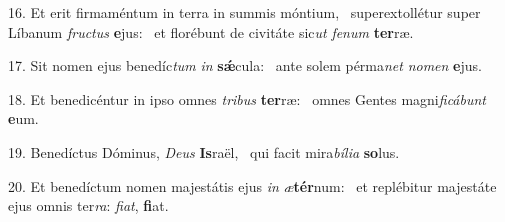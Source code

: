 16. Et erit firmaméntum in terra in summis móntium, \dag\  superextollétur super Líbanum \textit{fruc}\textit{tus} \textbf{e}jus: \ast\  et florébunt de civitáte sic\textit{ut} \textit{fe}\textit{num} \textbf{ter}ræ.\

17. Sit nomen ejus benedíc\textit{tum} \textit{in} \textbf{sǽ}cula: \ast\  ante solem pérma\textit{net} \textit{no}\textit{men} \textbf{e}jus.\

18. Et benedicéntur in ipso omnes \textit{tri}\textit{bus} \textbf{ter}ræ: \ast\  omnes Gentes magni\textit{fi}\textit{cá}\textit{bunt} \textbf{e}um.\

19. Benedíctus Dóminus, \textit{De}\textit{us} \textbf{Is}raël, \ast\  qui facit mira\textit{bí}\textit{li}\textit{a} \textbf{so}lus.\

20. Et benedíctum nomen majestátis ejus \textit{in} \textit{æ}\textbf{tér}num: \ast\  et replébitur majestáte ejus omnis ter\textit{ra}: \textit{fi}\textit{at}, \textbf{fi}at.\

